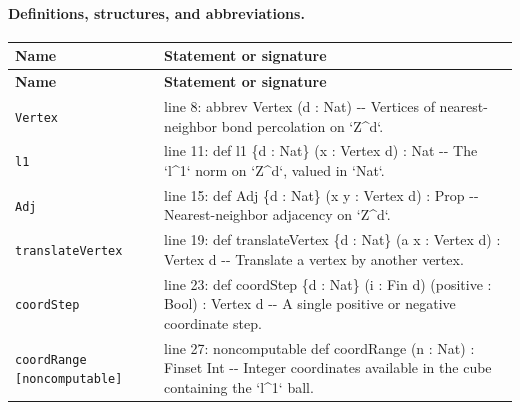 \documentclass[10pt]{article}
\begin{document}
\paragraph{Definitions, structures, and abbreviations.}
\begin{longtable}{>{\raggedright\arraybackslash}p{} >{\raggedright\arraybackslash}p{}}
\textbf{Name} & \textbf{Statement or signature} \\
\hline
\endfirsthead
\textbf{Name} & \textbf{Statement or signature} \\
\hline
\endhead
\texttt{Vertex} & {\ttfamily\scriptsize line 8:\allowbreak{} abbrev Vertex (\allowbreak{}d :\allowbreak{} Nat)\allowbreak{} -\allowbreak{}-\allowbreak{} Vertices of nearest-\allowbreak{}neighbor bond percolation on `Z\textasciicircum{}d`.\allowbreak{}} \\[0.45em]
\texttt{l1} & {\ttfamily\scriptsize line 11:\allowbreak{} def l1 \{d :\allowbreak{} Nat\} (\allowbreak{}x :\allowbreak{} Vertex d)\allowbreak{} :\allowbreak{} Nat -\allowbreak{}-\allowbreak{} The `l\textasciicircum{}1` norm on `Z\textasciicircum{}d`,\allowbreak{} valued in `Nat`.\allowbreak{}} \\[0.45em]
\texttt{Adj} & {\ttfamily\scriptsize line 15:\allowbreak{} def Adj \{d :\allowbreak{} Nat\} (\allowbreak{}x y :\allowbreak{} Vertex d)\allowbreak{} :\allowbreak{} Prop -\allowbreak{}-\allowbreak{} Nearest-\allowbreak{}neighbor adjacency on `Z\textasciicircum{}d`.\allowbreak{}} \\[0.45em]
\texttt{translateVertex} & {\ttfamily\scriptsize line 19:\allowbreak{} def translateVertex \{d :\allowbreak{} Nat\} (\allowbreak{}a x :\allowbreak{} Vertex d)\allowbreak{} :\allowbreak{} Vertex d -\allowbreak{}-\allowbreak{} Translate a vertex by another vertex.\allowbreak{}} \\[0.45em]
\texttt{coordStep} & {\ttfamily\scriptsize line 23:\allowbreak{} def coordStep \{d :\allowbreak{} Nat\} (\allowbreak{}i :\allowbreak{} Fin d)\allowbreak{} (\allowbreak{}positive :\allowbreak{} Bool)\allowbreak{} :\allowbreak{} Vertex d -\allowbreak{}-\allowbreak{} A single positive or negative coordinate step.\allowbreak{}} \\[0.45em]
\texttt{coordRange [noncomputable]} & {\ttfamily\scriptsize line 27:\allowbreak{} noncomputable def coordRange (\allowbreak{}n :\allowbreak{} Nat)\allowbreak{} :\allowbreak{} Finset Int -\allowbreak{}-\allowbreak{} Integer coordinates available in the cube containing the `l\textasciicircum{}1` ball.\allowbreak{}} \\[0.45em]

\end{longtable}
\end{document}
